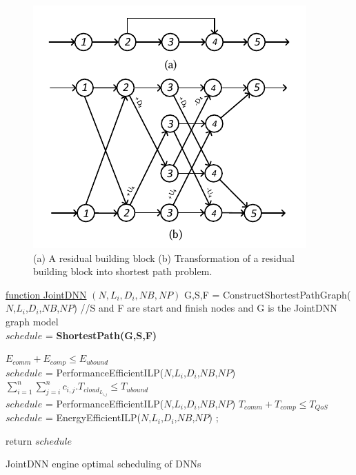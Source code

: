 \begin{figure}[b]
\includegraphics{resnet}
\caption{(a) A residual building block (b) Transformation of a residual building block into shortest path problem.}\label{resnet}
\end{figure}

\begin{algorithm}

    \underline{function JointDNN} $(N,L_i,D_i,NB,NP)$\;
G,S,F = ConstructShortestPathGraph($N$,$L_i$,$D_i$,$NB$,$NP$) //S and F are start and finish nodes and G is the JointDNN graph model\\
      {
      	$schedule$ = \textbf{ShortestPath(G,S,F)}
      }
      {
       {
	$E_{comm} + E_{comp} \le E_{ubound}$ \\
      	$schedule$ = PerformanceEfficientILP($N$,$L_i$,$D_i$,$NB$,$NP$)
      }
             {
           $\sum_{i=1}^{n}{\sum_{j=i}^{n}{
c_{i,j}.T_{cloud_{L_{i,j}}}}} \leq T_{ubound}$\\
      	$schedule$ = PerformanceEfficientILP($N$,$L_i$,$D_i$,$NB$,$NP$)
      }
             {
            $T_{comm} + T_{comp} \le T_{QoS}$ \\
      	$schedule$ = EnergyEfficientILP($N$,$L_i$,$D_i$,$NB$,$NP$)
      };\

      }
       return $schedule$\;
    \caption{JointDNN engine optimal scheduling of DNNs}
\end{algorithm}